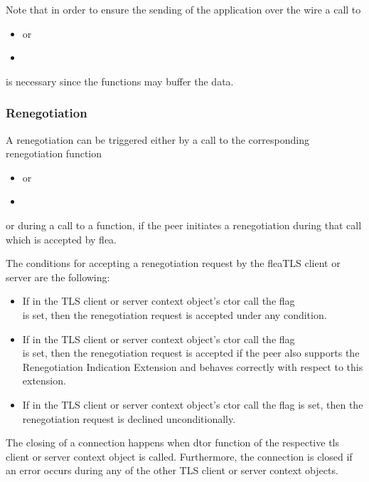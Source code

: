 \documentclass[a4paper,11pt]{scrartcl}
\begin{document}
Note that in order to ensure the sending of the application over the wire a call
to 
\begin{itemize}
  \item {} or
  \item {}
  \end{itemize}
  is necessary since the  functions may buffer the data.

  \subsubsection{Renegotiation}
A renegotiation can be triggered either by a call to the corresponding
renegotiation function
\begin{itemize}
  \item {} or
\item {}
  \end{itemize}
  or during a call to a  function, if the peer initiates a
  renegotiation during that call which is accepted by flea.

  The conditions for accepting a renegotiation request by the  fleaTLS client or
  server are the following:
  \begin{itemize}
    \item If in the TLS client or server context object's ctor call the flag \\ is
      set, then the renegotiation request is accepted under any condition.
    \item If in the TLS client or server context object's ctor call the flag \\ is
      set, then the renegotiation request is accepted if the peer also supports
      the Renegotiation Indication Extension and behaves correctly with respect
      to this extension.
      \item If in the TLS client or server context object's ctor call the flag  is
      set, then the renegotiation request is declined unconditionally.
  \end{itemize}

  The closing of a connection happens when dtor function of the respective tls
  client or server context object is called. Furthermore, the connection is
  closed if an error occurs during any of the other TLS client or server context
  objects.
\end{document}
